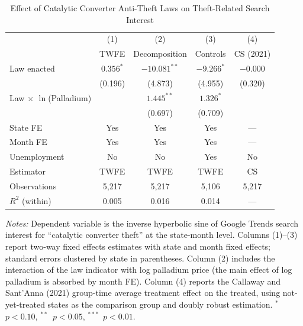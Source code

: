 \begin{table}[htbp]
\centering
\caption{Effect of Catalytic Converter Anti-Theft Laws on Theft-Related Search Interest}
\label{tab:main}
\begin{tabular}{lcccc}
\hline\hline
 & (1) & (2) & (3) & (4) \\
 & TWFE & Decomposition & Controls & CS (2021) \\
\hline
Law enacted & $0.356^{*}$ & $-10.081^{**}$ & $-9.266^{*}$ & $-0.000$ \\
 & (0.196) & (4.873) & (4.955) & (0.320) \\
Law $\times$ $\ln$(Palladium) & & $1.445^{**}$ & $1.326^{*}$ & \\
 & & (0.697) & (0.709) & \\
\hline
State FE & Yes & Yes & Yes & --- \\
Month FE & Yes & Yes & Yes & --- \\
Unemployment & No & No & Yes & No \\
Estimator & TWFE & TWFE & TWFE & CS \\
Observations & 5,217 & 5,217 & 5,106 & 5,217 \\
$R^2$ (within) & 0.005 & 0.016 & 0.014 & --- \\
\hline\hline
\end{tabular}
\begin{tablenotes}[flushleft]
\small
\item \textit{Notes:} Dependent variable is the inverse hyperbolic sine of Google Trends search interest for ``catalytic converter theft'' at the state-month level. Columns (1)--(3) report two-way fixed effects estimates with state and month fixed effects; standard errors clustered by state in parentheses. Column (2) includes the interaction of the law indicator with log palladium price (the main effect of log palladium is absorbed by month FE). Column (4) reports the Callaway and Sant'Anna (2021) group-time average treatment effect on the treated, using not-yet-treated states as the comparison group and doubly robust estimation. $^{*}$~$p<0.10$, $^{**}$~$p<0.05$, $^{***}$~$p<0.01$.
\end{tablenotes}
\end{table}

